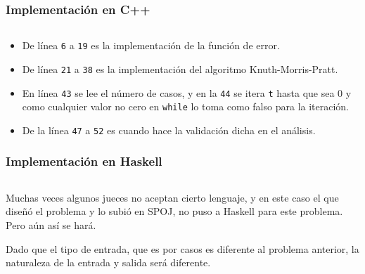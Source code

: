 

\subsubsection{Implementación en C++}
\inputminted[linenos, frame=lines, fontsize=\footnotesize]{cpp}{problemas/cpp/EC_WORLD.cpp}
\begin{itemize}
\item De línea \texttt{6} a \texttt{19} es la implementación de la función de error.

\item De línea \texttt{21} a \texttt{38} es la implementación del algoritmo Knuth-Morris-Pratt.

\item En línea \texttt{43} se lee el número de casos, y en la \texttt{44} se itera \texttt{t} hasta
que sea 0 y como cualquier valor no cero en \texttt{while} lo toma como falso para la iteración.

\item De la línea \texttt{47} a \texttt{52} es cuando hace la validación dicha en el análisis.

\end{itemize}

\newpage

\subsubsection{Implementación en Haskell}
\inputminted[linenos, frame=lines]{haskell}{problemas/haskell/EC_WORLD.hs}

Muchas veces algunos jueces no aceptan cierto lenguaje, y en este caso el que diseñó el problema y
lo subió en SPOJ, no puso a Haskell para este problema. Pero aún así se hará.

Dado que el tipo de entrada, que es por casos es diferente al problema anterior, la naturaleza de
la entrada y salida será diferente.

